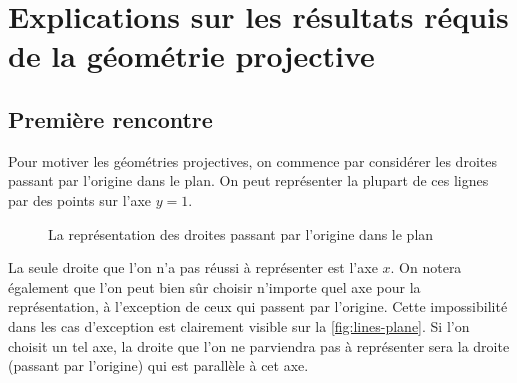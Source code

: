 \documentclass[12pt, oneside]{memoir}
\theoremstyle{definition}
\theoremstyle{remark}
\begin{document}
\chapter{Explications sur les résultats réquis de la géométrie projective}
\section{Première rencontre}
Pour motiver les géométries projectives, on commence par considérer
les droites passant par l'origine dans le plan. On peut représenter la
plupart de ces lignes par des points sur l'axe $y=1$.
\begin{figure}[H]
  \centering
  \caption{La représentation des droites passant par l'origine dans le
    plan}
  \label{fig:lines-plane}
\end{figure}
La seule droite que l'on n'a pas réussi à représenter est l'axe
$x$. On notera également que l'on peut bien sûr choisir n'importe quel
axe pour la représentation, à l'exception de ceux qui passent par
l'origine. Cette impossibilité dans les cas d'exception est clairement
visible sur la \autoref{fig:lines-plane}. Si l'on choisit un tel axe,
la droite que l'on ne parviendra pas à représenter sera la droite
(passant par l'origine) qui est parallèle à cet axe.
\end{document}
